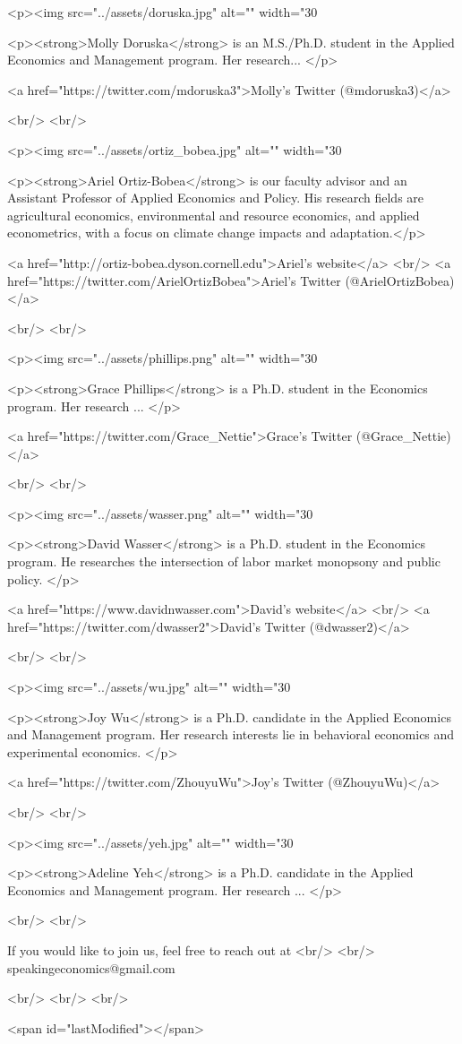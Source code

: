 <p><img src="../assets/doruska.jpg" alt="" width="30%

<p><strong>Molly Doruska</strong> is an M.S./Ph.D. student in the Applied Economics and Management program. Her research... </p>

<a href="https://twitter.com/mdoruska3">Molly's Twitter (@mdoruska3)</a>

<br/>
<br/>

<p><img src="../assets/ortiz_bobea.jpg" alt="" width="30%

<p><strong>Ariel Ortiz-Bobea</strong> is our faculty advisor and an Assistant Professor of Applied Economics and Policy. His research fields are agricultural economics, environmental and resource economics, and applied econometrics, with a focus on climate change impacts and adaptation.</p>

<a href="http://ortiz-bobea.dyson.cornell.edu">Ariel's website</a>
<br/>
<a href="https://twitter.com/ArielOrtizBobea">Ariel's Twitter (@ArielOrtizBobea)</a> 

<br/>
<br/>

<p><img src="../assets/phillips.png" alt="" width="30%

<p><strong>Grace Phillips</strong> is a Ph.D. student in the Economics program. Her research ... </p>

<a href="https://twitter.com/Grace_Nettie">Grace's Twitter (@Grace_Nettie)</a>

<br/>
<br/>

<p><img src="../assets/wasser.png" alt="" width="30%

<p><strong>David Wasser</strong> is a Ph.D. student in the Economics program. He researches the intersection of labor market monopsony and public policy. </p>

<a href="https://www.davidnwasser.com">David's website</a>
<br/>
<a href="https://twitter.com/dwasser2">David's Twitter (@dwasser2)</a>

<br/>
<br/>

<p><img src="../assets/wu.jpg" alt="" width="30%

<p><strong>Joy Wu</strong> is a Ph.D. candidate in the Applied Economics and Management program. Her research interests lie in behavioral economics and experimental economics. </p>

<a href="https://twitter.com/ZhouyuWu">Joy's Twitter (@ZhouyuWu)</a>

<br/>
<br/>

<p><img src="../assets/yeh.jpg" alt="" width="30%

<p><strong>Adeline Yeh</strong> is a Ph.D. candidate in the Applied Economics and Management program. Her research ... </p>


<br/>
<br/>

    
    If you would like to join us, feel free to reach out at
    <br/>
    <br/>
    speakingeconomics@gmail.com

 

<br/>
<br/>
<br/>

     
  <span id="lastModified"></span>
